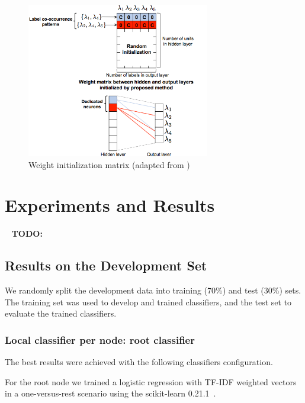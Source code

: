 \documentclass[11pt,a4paper]{article}
\begin{document}
\begin{figure}[h]
    \centering
    \includegraphics[width=8cm]{global_classifier_init.png}
    \caption{Weight initialization matrix (adapted from )}
    \label{fig:mesh1}
\end{figure}




\section{Experiments and Results}\label{experiments}

\ \newline
\textbf{TODO:}
\ \newline

\subsection{Results on the Development Set}

We randomly split the development data into training (70\%) and test (30\%) sets.
The training set was used to develop and trained classifiers, and the test set
to evaluate the trained classifiers.

\subsubsection{Local classifier per node: root classifier}

The best results were achieved with the following classifiers configuration.

For the root node we trained a logistic regression with TF-IDF weighted vectors
in a one-versus-rest scenario using the scikit-learn 0.21.1~\cite{Pedregosa:2011:SML:1953048.2078195}.

\end{document}
